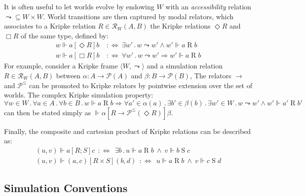 \documentclass[acmsmall,screen,review,anonymous]{acmart}
\newcommand{\ifr}[1]{\mathrel{[{#1}]}}
\begin{document}
It is often useful to let worlds evolve
by endowing $W$ with an \emph{accessibility} relation
${\leadsto} \subseteq W \times W$.
World transitions are then captured by modal relators,
which associates to a Kripke relation $R \in \mathcal{R}_W(A, B)$
the Kripke relations $\Diamond R$ and $\Box R$ of the same type, defined by:
\begin{align*}
  w \Vdash a \ifr{\Diamond R} b
  \:&:\Leftrightarrow\:
  \exists w' \mathbin. w \leadsto w' \wedge w' \Vdash a \mathrel{R} b
\\
  w \Vdash a \ifr{\Box R} b
  \:&:\Leftrightarrow\:
  \forall w' \mathbin. w \leadsto w' \Rightarrow w' \Vdash a \mathrel{R} b
\end{align*}
For example,
consider a Kripke frame $\langle W, {\leadsto} \rangle$ and
a simulation relation $R \in \mathcal{R}_W(A, B)$
between $\alpha : A \rightarrow \mathcal{P}(A)$
and $\beta : B \rightarrow \mathcal{P}(B)$,
The relators $\rightarrow$ and $\mathcal{P}^\le$
can be promoted to Kripke relators
by pointwise extension over the set of worlds.
The complex Kripke simulation property:
{\small
\[
  \forall w \in W \mathbin.
  \forall a \in A \mathbin.
  \forall b \in B \mathbin.
  w \Vdash a \mathrel{R} b \Rightarrow
  \forall a' \in \alpha(a) \mathbin.
  \exists b' \in \beta(b) \mathbin.
  \exists w' \in W \mathbin.
  w \leadsto w' \wedge w' \Vdash a' \mathrel{R} b'
\]
}
can then be stated simply as
$
  \Vdash \alpha \ifr{R \rightarrow \mathcal{P}^\le(\Diamond R)} \beta
$.

Finally,
the composite and cartesian product
of Kripke relations can be described as:
\[
  \begin{array}{c}
    (u, v) \Vdash a \mathrel{[R \mathbin; S]} c \:\::\Leftrightarrow\:\:
      \exists b \mathbin.
        u \Vdash a \mathrel{R} b \:\wedge\: v \Vdash b \mathrel{S} c
  \\
    (u, v) \Vdash (a, c) \mathrel{[R \times S]} (b, d) \:\::\Leftrightarrow\:\:
      u \Vdash a \mathrel{R} b \:\wedge\: v \Vdash c \mathrel{S} d
  \end{array}
\]

\subsection{Simulation Conventions} %
\end{document}
